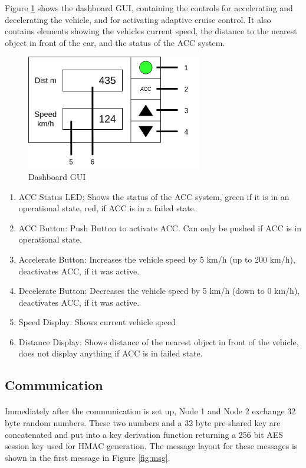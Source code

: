 Figure \ref{fig:gui} shows the dashboard GUI, containing the controls for accelerating and decelerating the vehicle, and for activating adaptive cruise control. It also contains elements showing the vehicles current speed, the distance to the nearest object in front of the car, and the status of the ACC system.

\begin{figure}[h]
	\includegraphics[height=50mm]{images/GUI.png}
	\centering
	\caption{Dashboard GUI}
	\label{fig:gui}
\end{figure}

\begin{enumerate}
  \item ACC Status LED: Shows the status of the ACC system, green if it is in an operational state, red, if ACC  is in a failed state.
  \item ACC Button: Push Button to activate ACC. Can only be pushed if ACC is in operational state.
  \item Accelerate Button: Increases the vehicle speed by 5 km/h (up to 200 km/h), deactivates ACC, if it was active.
  \item Decelerate Button: Decreases the vehicle speed by 5 km/h (down to 0 km/h), deactivates ACC, if it was active.
  \item Speed Display: Shows current vehicle speed
  \item Distance Display: Shows distance of the nearest object in front of the vehicle, does not display anything if ACC is in failed state.
\end{enumerate}

\subsection{Communication}

\paragraph{} Immediately after the communication is set up, Node 1 and Node 2 exchange 32 byte random numbers. These two numbers and a 32 byte pre-shared key are concatenated and put into a key derivation function returning a 256 bit AES session key used for HMAC generation. The message layout for these messages is shown in the first message in Figure \ref{fig:msg}.

